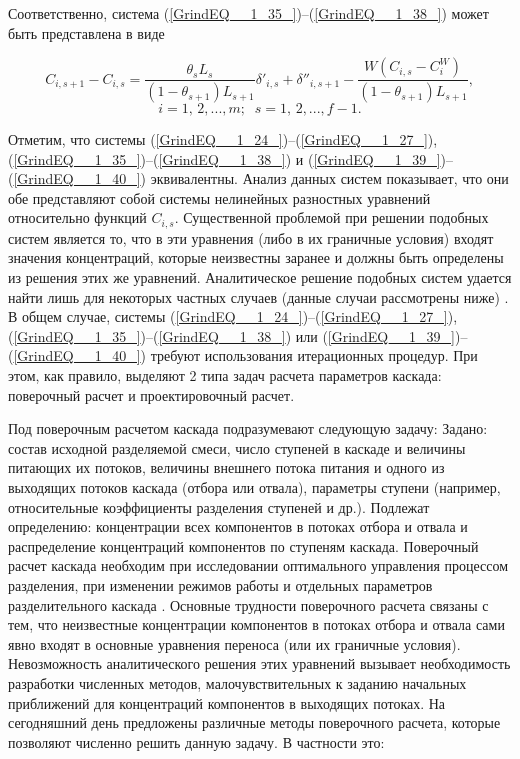 Соответственно, система (\ref{GrindEQ__1_35_})--(\ref{GrindEQ__1_38_}) может быть представлена в виде

\begin{equation} \label{GrindEQ__1_40_} 
  C_{i,s+1} -C_{i,s} =\frac{\theta _{s} L_{s} }{(1-\theta _{s+1} )L_{s+1} } \delta '_{i,s} +\delta ''_{i,s+1} -\frac{W(C_{i,s} -C_{i}^{W} )}{(1-\theta _{s+1} )L_{s+1} } ,        
  \end{equation} 
  \[i=1,\, 2,...,m;\; \; s=1,\, 2,...,f-1.\] 

Отметим, что системы (\ref{GrindEQ__1_24_})--(\ref{GrindEQ__1_27_}), (\ref{GrindEQ__1_35_})--(\ref{GrindEQ__1_38_}) и (\ref{GrindEQ__1_39_})--(\ref{GrindEQ__1_40_}) эквивалентны. Анализ данных систем показывает, что они обе представляют собой системы нелинейных разностных уравнений относительно функций $C_{i,s}$. Существенной проблемой при решении подобных систем является то, что в эти уравнения (либо в их граничные условия) входят значения концентраций, которые неизвестны заранее и должны быть определены из решения этих же уравнений. Аналитическое решение подобных систем удается найти лишь для некоторых частных случаев (данные случаи рассмотрены ниже) \cite{sulaberidzeTeoriyaKaskadovDlya2011}. В общем случае, системы (\ref{GrindEQ__1_24_})--(\ref{GrindEQ__1_27_}), (\ref{GrindEQ__1_35_})--(\ref{GrindEQ__1_38_}) или (\ref{GrindEQ__1_39_})--(\ref{GrindEQ__1_40_}) требуют использования итерационных процедур. При этом, как правило, выделяют 2 типа задач расчета параметров каскада: поверочный расчет и проектировочный расчет.

Под поверочным расчетом каскада подразумевают следующую задачу:
Задано: состав исходной разделяемой смеси,  число ступеней в каскаде и величины питающих их потоков, величины внешнего потока питания и одного из выходящих потоков каскада (отбора или отвала), параметры ступени (например, относительные коэффициенты разделения ступеней и др.).
Подлежат определению: концентрации всех компонентов в потоках отбора  и отвала и распределение концентраций компонентов по ступеням каскада. 
Поверочный расчет каскада необходим при исследовании оптимального управления процессом разделения, при изменении режимов работы и отдельных параметров разделительного каскада \cite{sulaberidzeTeoriyaKaskadovDlya2011}. Основные трудности поверочного расчета связаны с тем, что неизвестные концентрации компонентов в потоках отбора и отвала сами явно входят в основные уравнения переноса (или их граничные условия). Невозможность аналитического решения этих уравнений вызывает необходимость разработки численных методов, малочувствительных к заданию начальных приближений для концентраций компонентов в выходящих потоках. На сегодняшний день предложены различные методы поверочного расчета, которые позволяют численно решить данную задачу. В частности это:  

